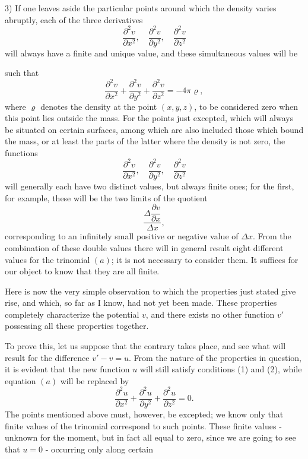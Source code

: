 \documentclass[11pt]{article}
\begin{document}
3) If one leaves aside the particular points around which the density varies abruptly, each of the three derivatives
\[
\frac{\partial^2 v}{\partial x^2},\quad \frac{\partial^2 v}{\partial y^2},\quad \frac{\partial^2 v}{\partial z^2}
\]
will always have a finite and unique value, and these simultaneous values will be

such that
\begin{equation}\tag{a}
\frac{\partial^2 v}{\partial x^2}+\frac{\partial^2 v}{\partial y^2}+\frac{\partial^2 v}{\partial z^2}=-4\pi\varrho,
\end{equation}
where $\varrho$ denotes the density at the point $(x,y,z)$, to be considered zero when this point lies outside the mass. For the points just excepted, which will always be situated on certain surfaces, among which are also included those which bound the mass, or at least the parts of the latter where the density is not zero, the functions
\[
\frac{\partial^2 v}{\partial x^2},\quad \frac{\partial^2 v}{\partial y^2},\quad \frac{\partial^2 v}{\partial z^2}
\]
will generally each have two distinct values, but always finite ones; for the first, for example, these will be the two limits of the quotient
\[
\frac{\Delta\dfrac{\partial v}{\partial x}}{\Delta x},
\]
corresponding to an infinitely small positive or negative value of $\Delta x$. From the combination of these double values there will in general result eight different values for the trinomial $(a)$; it is not necessary to consider them. It suffices for our object to know that they are all finite.

Here is now the very simple observation to which the properties just stated give rise, and which, so far as I know, had not yet been made. These properties completely characterize the potential $v$, and there exists no other function $v'$ possessing all these properties together.

To prove this, let us suppose that the contrary takes place, and see what will result for the difference $v'-v=u$. From the nature of the properties in question, it is evident that the new function $u$ will still satisfy conditions (1) and (2), while equation $(a)$ will be replaced by
\[
\frac{\partial^2 u}{\partial x^2}+\frac{\partial^2 u}{\partial y^2}+\frac{\partial^2 u}{\partial z^2}=0.
\]
The points mentioned above must, however, be excepted; we know only that finite values of the trinomial correspond to such points. These finite values - unknown for the moment, but in fact all equal to zero, since we are going to see that $u=0$ - occurring only along certain
\end{document}

